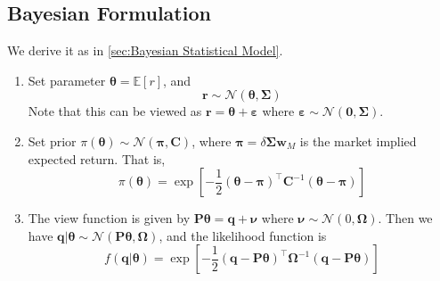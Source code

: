 \documentclass[13pt]{article}
\theoremstyle{definition}
\theoremstyle{remark}
\newcommand{\EE}{\mathbb{E}}
\begin{document}
\subsection{Bayesian Formulation}
We derive it as in  \cref{sec:Bayesian Statistical Model}.
\begin{enumerate}[label=(\alph*)]
    \item Set parameter $\bm{\theta}=\EE[r]$, and
\[
\bm{r} \sim \mathcal{N}(\bm{\theta}, \mathbf{\Sigma})
\]
Note that this can be viewed as $\bm{r}=\bm{\theta}+\bm{\varepsilon}$ where $\bm{\varepsilon}\sim \mathcal{N}(\bm{0}, \mathbf{\Sigma})$.
\item Set prior $\pi(\bm{\theta})\sim \mathcal{N}(\bm{\pi}, \mathbf{C})$, where $\bm{\pi}=\delta \mathbf{\Sigma}\bm{w}_M$ is the market implied expected return. That is,
\[
\pi(\bm{\theta})=\exp\left[-\frac{1}{2}(\bm{\theta}-\bm{\pi})^\top\mathbf{C}^{-1}(\bm{\theta}-\bm{\pi})\right]
\]
\item The view function is given by $\mathbf{P}\bm{\theta} = \bm{q}+\bm{\nu}$ where $\bm{\nu}\sim  \mathcal{N}(0, \mathbf{\Omega})$. Then we have $\bm{q}|\bm{\theta}\sim \mathcal{N}(\mathbf{P}\bm{\theta}, \mathbf{\Omega})$, and the likelihood function is 
\[
f(\bm{q}|\bm{\theta}) = \exp\left[-\frac{1}{2}(\bm{q}-\mathbf{P}\bm{\theta})^\top\mathbf{\Omega}^{-1}(\bm{q}-\mathbf{P}\bm{\theta})\right]
\]
\end{enumerate}
\end{document}
